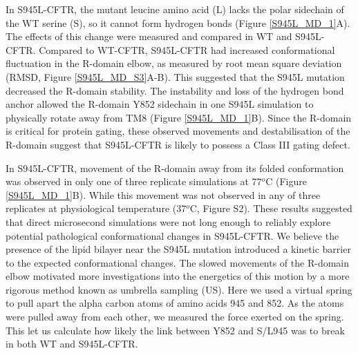 In S945L-CFTR, the mutant leucine amino acid (L) lacks the polar sidechain of the WT serine (S), so it cannot form hydrogen bonds (Figure \ref{S945L_MD_1}A). The effects of this change were measured and compared in WT and S945L-CFTR. Compared to WT-CFTR, S945L-CFTR had increased conformational fluctuation in the R-domain elbow, as measured by root mean square deviation (RMSD, Figure \ref{S945L_MD_S3}A-B). This suggested that the S945L mutation decreased the R-domain stability. The instability and loss of the hydrogen bond anchor allowed the R-domain Y852 sidechain in one S945L simulation to physically rotate away from TM8 (Figure \ref{S945L_MD_1}B). Since the R-domain is critical for protein gating, these observed movements and destabilisation of the R-domain suggest that S945L-CFTR is likely to possess a Class III gating defect.

In S945L-CFTR, movement of the R-domain away from its folded conformation was observed in only one of three replicate simulations at 77$^o$C (Figure \ref{S945L_MD_1}B). While this movement was not observed in any of three replicates at physiological temperature (37$^o$C, Figure S2). These results suggested that direct microsecond simulations were not long enough to reliably explore potential pathological conformational changes in S945L-CFTR. We believe the presence of the lipid bilayer near the S945L mutation introduced a kinetic barrier to the expected conformational changes. The slowed movements of the R-domain elbow motivated more investigations into the energetics of this motion by a more rigorous method known as umbrella sampling (US). Here we used a virtual spring to pull apart the alpha carbon atoms of amino acids 945 and 852. As the atoms were pulled away from each other, we measured the force exerted on the spring. This let us calculate how likely the link between Y852 and S/L945 was to break in both WT and S945L-CFTR.

